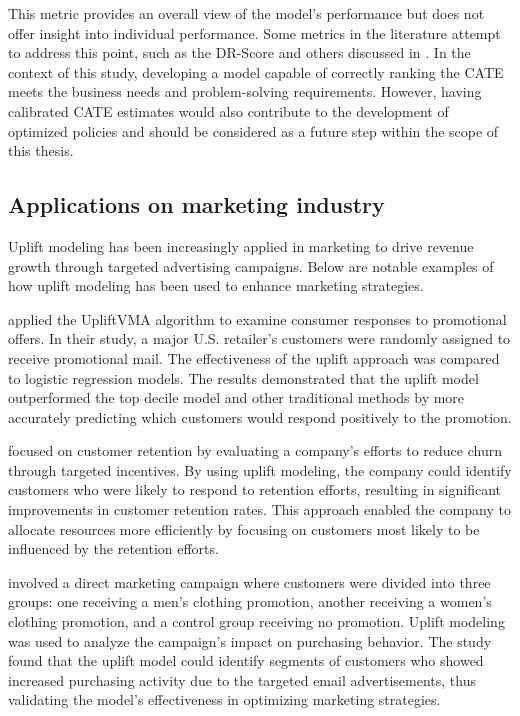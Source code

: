 This metric provides an overall view of the model’s performance but does not offer insight into individual performance. Some metrics in the literature attempt to address this point, such as the DR-Score and others discussed in \textcite{mahajan_empirical_2023}.
In the context of this study, developing a model capable of correctly ranking the \gls{CATE} meets the business needs and problem-solving requirements. However, having calibrated \gls{CATE} estimates would also contribute to the development of optimized policies and should
be considered as a future step within the scope of this thesis.

\subsection{Applications on marketing industry}
\label{sub:applications_marketing}

Uplift modeling has been increasingly applied in marketing to drive revenue growth through targeted advertising campaigns. Below are notable examples of how uplift modeling has been used to enhance marketing strategies.

\textcite{hansotia_incremental_2002} applied the UpliftVMA algorithm to examine consumer responses to promotional offers. In their study, a major U.S. retailer’s customers were randomly assigned to receive promotional mail. The effectiveness of the uplift approach was compared to
logistic regression models. The results demonstrated that the uplift model outperformed the top decile model and other traditional methods by more accurately predicting which customers would respond positively to the promotion.

\textcite{Radcliffe2007UsingCG} focused on customer retention by evaluating a company’s efforts to reduce churn through targeted incentives. By using uplift modeling, the company could identify customers who were likely to respond to retention efforts, resulting in significant improvements
in customer retention rates. This approach enabled the company to allocate resources more efficiently by focusing on customers most likely to be influenced by the retention efforts.

\textcite{blog_post} involved a direct marketing campaign where customers were divided into three groups: one receiving a men’s clothing promotion, another receiving a women’s clothing promotion, and a control group receiving no promotion. Uplift modeling was used to analyze the campaign’s 
impact on purchasing behavior. The study found that the uplift model could identify segments of customers who showed increased purchasing activity due to the targeted email advertisements, thus validating the model’s effectiveness in optimizing marketing strategies.

